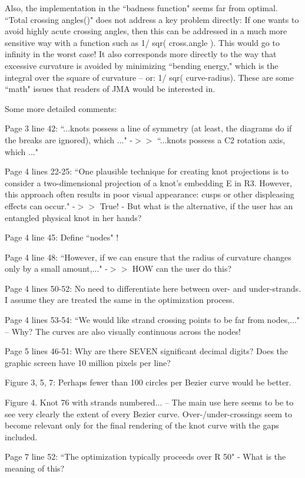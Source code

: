 \documentclass[12pt]{article}
\begin{document}
Also, the implementation in the ``badness function" seems far from
optimal.  ``Total crossing angles()" does not address a key problem
directly: If one wants to avoid highly acute crossing angles, then
this can be addressed in a much more sensitive way with a function
such as 1/ sqr( cross.angle ).  This would go to infinity in the worst
case!  It also corresponds more directly to the way that excessive
curvature is avoided by minimizing ``bending energy," which is the
integral over the square of curvature -- or: 1/ sqr( curve-radius).
These are some ``math" issues that readers of JMA would be interested
in.


Some more detailed comments:

Page 3 line 42: ``...knots possess a line of symmetry (at least, the
diagrams do if the breaks are ignored), which ..."  -$>>$ ``...knots
possess a C2 rotation axis, which ..."

Page 4 lines 22-25: ``One plausible technique for creating knot
projections is to consider a two-dimensional projection of a knot's
embedding E in R3. However, this approach often results in poor visual
appearance: cusps or other displeasing effects can occur."  -$>>$ True!
- But what is the alternative, if the user has an entangled physical
knot in her hands?

Page 4 line 45: Define ``nodes" !

Page 4 line 48: ``However, if we can ensure that the radius of
curvature changes only by a small amount,..."  -$>>$ HOW can the user do
this?

Page 4 lines 50-52: No need to differentiate here between over- and
under-strands.  I assume they are treated the same in the optimization
process.

Page 4 lines 53-54: ``We would like strand crossing points to be far
from nodes,..."  -- Why?  The curves are also visually continuous across
the nodes!

Page 5 lines 46-51: Why are there SEVEN significant decimal digits?
Does the graphic screen have 10 million pixels per line?

Figure 3, 5, 7: Perhaps fewer than 100 circles per Bezier curve would
be better.


Figure 4.  Knot 76 with strands numbered... -- The main use here seems
to be to see very clearly the extent of every Bezier curve.
Over-/under-crossings seem to become relevant only for the final
rendering of the knot curve with the gaps included.

Page 7 line 52: ``The optimization typically proceeds over R 50" - What
is the meaning of this?
\end{document}
